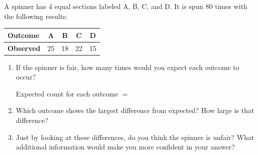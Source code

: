 \documentclass[10pt]{article}
\begin{document}
\namedateperiod

\vspace{0.1in}
A spinner has 4 equal sections labeled A, B, C, and D. It is spun 80 times with the
following results:

\vspace{0.08in}
\renewcommand{\arraystretch}{1.3}
\begin{tabularx}{0.6\linewidth}{Xcccc}
    \textbf{Outcome} & A & B & C & D \\
    \hline
    \textbf{Observed} & 25 & 18 & 22 & 15 \\
\end{tabularx}

\vspace{0.15in}

\begin{enumerate}

  \item If the spinner is fair, how many times would you expect each outcome to occur?

        \vspace{0.05in}
        Expected count for each outcome $= $ \blank{4cm}

        \vspace{0.1in}

  \item Which outcome shows the largest difference from expected? How large is that
        difference?


  \item Just by looking at these differences, do you think the spinner is unfair?
        What additional information would make you more confident in your answer?


\end{enumerate}
\end{document}
